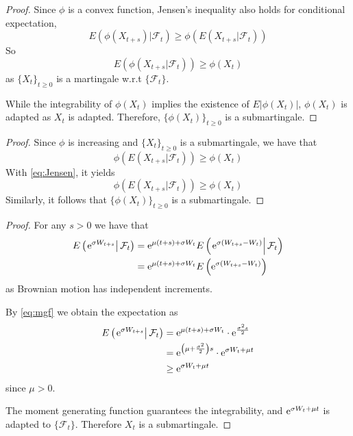 \documentclass{homework}
\begin{document}
    \problem
    \begin{subproblem}
        \item
        \begin{proof}
            Since $\phi$ is a convex function, Jensen's inequality
            also holds for conditional expectation,
            \begin{equation}
                \label{eq:Jensen}
                E(\phi(X_{t+s})|\mathcal F_t)
                \geq\phi(E(X_{t+s}|\mathcal F_t))
            \end{equation}
            So
            \[E(\phi(X_{t+s}|\mathcal F_t))\geq\phi(X_t)\]
            as $\{X_t\}_{t\geq 0}$ is a martingale w.r.t $\{\mathcal F_t\}$.

            While the integrability of $\phi(X_t)$ implies the existence of
            $E|\phi(X_t)|$, $\phi(X_t)$ is adapted as $X_t$ is adapted.
            Therefore, $\{\phi(X_t)\}_{t\geq 0}$ is a submartingale.
        \end{proof}

        \item
        \begin{proof}
            Since $\phi$ is increasing and $\{X_t\}_{t\geq 0}$ is a
            submartingale, we have that
            \[\phi(E(X_{t+s}|\mathcal F_t))\geq\phi(X_t)\]
            With \cref{eq:Jensen}, it yields
            \[\phi(E(X_{t+s}|\mathcal F_t))\geq\phi(X_t)\]
            Similarly, it follows that $\{\phi(X_t)\}_{t\geq 0}$
            is a submartingale.
        \end{proof}
    \end{subproblem}

    \problem
    \begin{proof}
        For any $s>0$ we have that
        \newcommand{\conde}[1]{E\left(\left. #1 \right|\mathcal F_t\right)}
        \[\begin{aligned}
            \conde{\e^{\sigma W_{t+s}}}
            &=\e^{\mu(t+s)+\sigma W_t}\conde{\e^{\sigma(W_{t+s}-W_t)}}\\
            &=\e^{\mu(t+s)+\sigma W_t}E\left(\e^{\sigma(W_{t+s}-W_t)}\right)
        \end{aligned}\]
        as Brownian motion has independent increments.

        By \cref{eq:mgf} we obtain the expectation as
        \[\begin{aligned}
            \conde{\e^{\sigma W_{t+s}}}
            &=\e^{\mu(t+s)+\sigma W_t}\cdot\e^{\frac{\sigma^2s}{2}}\\
            &=\e^{\left(\mu+\frac{\sigma^2}{2}\right)s}\cdot\e^{\sigma W_t+\mu t}\\
            &\geq\e^{\sigma W_t+\mu t}
        \end{aligned}\]
        since $\mu>0$.

        The moment generating function guarantees the integrability,
        and $\mathrm e^{\sigma W_t+\mu t}$ is adapted to $\{\mathcal F_t\}$.
        Therefore $X_t$ is a submartingale.
    \end{proof}
\end{document}
